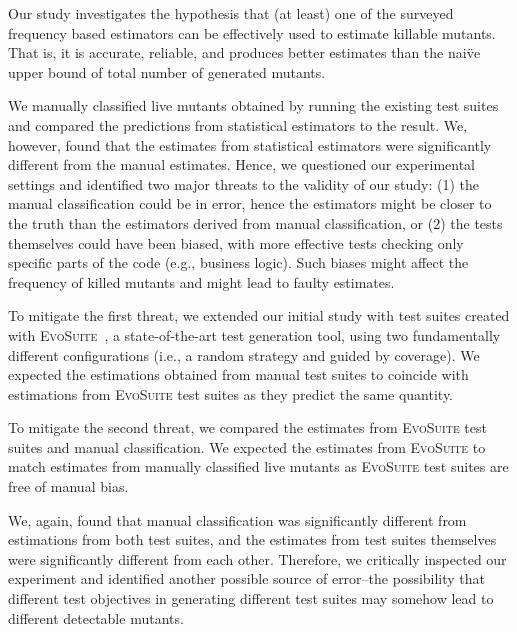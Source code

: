 \documentclass[sigconf,review,anonymous]{acmart}
\newcommand{\Evosuite}{\textsc{EvoSuite}\xspace}
\begin{document}
\begin{tcolorbox}[boxrule=0.5pt, arc=4pt, boxsep=0pt, width=\columnwidth]
Our study investigates the hypothesis that (at least)
one of the surveyed frequency based estimators can be effectively used to
estimate killable mutants.
That is, it is accurate, reliable, and
produces better estimates than the nai\"ve upper bound of total
number of generated mutants.
\end{tcolorbox}

We manually classified live mutants obtained by running the
existing test suites
and compared the predictions from statistical estimators to the result.
We, however, found that
the estimates from statistical estimators
were significantly different from the manual estimates.
Hence, we questioned our experimental settings
and identified two major threats to the validity of our study:
(1) the manual classification could be in error, hence the
estimators might be closer to the truth than the estimators derived from manual
classification, or
(2) the tests themselves could have been biased, with more effective tests checking
 only specific parts of the code (e.g., business logic).
Such biases might affect the frequency of killed mutants and might lead to faulty estimates.

To mitigate the first threat, we extended our initial study with test suites created with
\Evosuite~\cite{fraser2011evosuite}, a state-of-the-art test generation tool,
using two fundamentally different configurations (i.e., a random strategy and guided by coverage).
We expected the estimations obtained from manual test suites
to coincide with estimations from \Evosuite test suites
as they predict the same quantity.

To mitigate the second threat, we compared the estimates from \Evosuite
test suites and manual classification. We expected
the estimates from \Evosuite to match estimates from manually classified live
mutants as \Evosuite test suites are free of manual bias. %

We, again, found that manual classification was significantly different from
estimations from both test suites, and the estimates from test suites themselves
were significantly different from each other.
Therefore, we critically inspected our experiment and identified another
possible source of error--the possibility that different test objectives
in generating different test suites may somehow lead to different
detectable mutants.
\end{document}
